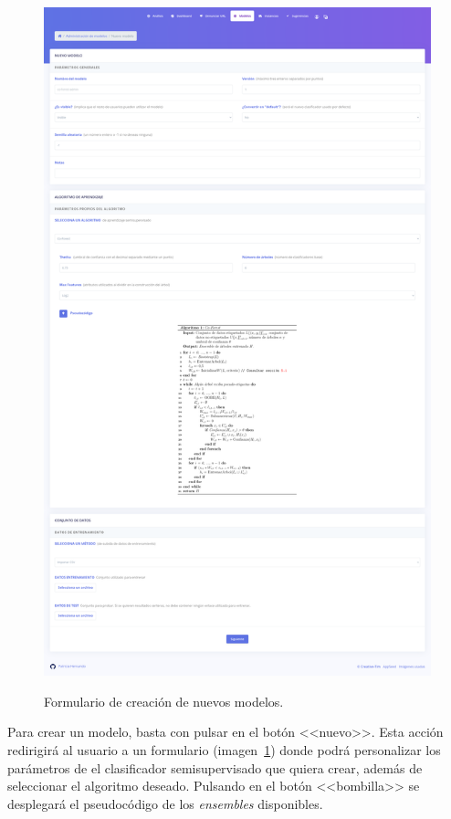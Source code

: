 \begin{figure}[h]
	\caption[Manual de usuario: nuevo modelo]{Formulario de creación de nuevos modelos.}
	\centering
	\includegraphics[width=\textwidth]{../img/anexos/user_guide/5_new_model}
	\label{e-5:new-model}
\end{figure}

Para crear un modelo, basta con pulsar en el botón <<nuevo>>. Esta acción redirigirá al usuario a un formulario (imagen~\ref{e-5:new-model}) donde podrá personalizar los parámetros de el clasificador semisupervisado que quiera crear, además de seleccionar el algoritmo deseado. Pulsando en el botón <<bombilla>> se desplegará el pseudocódigo de los \textit{ensembles} disponibles.

